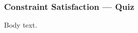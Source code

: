 \documentclass{ltx-talk}
\newcommand{\frametitlesub}[2]{\frametitle{#1 --- {\normalsize #2}}}
\begin{document}
\begin{frame}[vertical-alignment=center]
\frametitlesub{Constraint Satisfaction}{Quiz}
Body text.
\end{frame}
\end{document}
